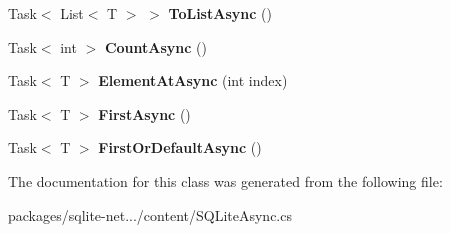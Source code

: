 \begin{DoxyCompactItemize}
\item 
\hypertarget{classSQLite_1_1AsyncTableQuery_a7343ff525af21bdc055935f46a39ae72}{}Task$<$ List$<$ T $>$ $>$ {\bfseries To\+List\+Async} ()\label{classSQLite_1_1AsyncTableQuery_a7343ff525af21bdc055935f46a39ae72}

\item 
\hypertarget{classSQLite_1_1AsyncTableQuery_a70df4365834cfe29d0adb1c1841266b0}{}Task$<$ int $>$ {\bfseries Count\+Async} ()\label{classSQLite_1_1AsyncTableQuery_a70df4365834cfe29d0adb1c1841266b0}

\item 
\hypertarget{classSQLite_1_1AsyncTableQuery_ade7303c76081c4b9cd80b4d25806ca30}{}Task$<$ T $>$ {\bfseries Element\+At\+Async} (int index)\label{classSQLite_1_1AsyncTableQuery_ade7303c76081c4b9cd80b4d25806ca30}

\item 
\hypertarget{classSQLite_1_1AsyncTableQuery_a2e3bae8cc7dc0b16abd95d4516d61971}{}Task$<$ T $>$ {\bfseries First\+Async} ()\label{classSQLite_1_1AsyncTableQuery_a2e3bae8cc7dc0b16abd95d4516d61971}

\item 
\hypertarget{classSQLite_1_1AsyncTableQuery_aac82a5fa254a7f1c6a1a08f534989604}{}Task$<$ T $>$ {\bfseries First\+Or\+Default\+Async} ()\label{classSQLite_1_1AsyncTableQuery_aac82a5fa254a7f1c6a1a08f534989604}

\end{DoxyCompactItemize}


The documentation for this class was generated from the following file\+:\begin{DoxyCompactItemize}
\item 
packages/sqlite-\/net.../content/S\+Q\+Lite\+Async.\+cs\end{DoxyCompactItemize}
